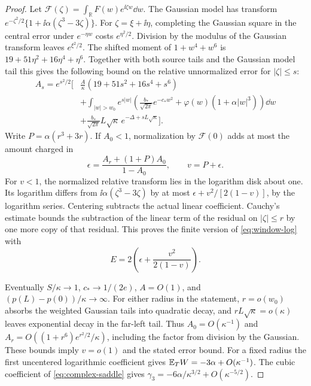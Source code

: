 \begin{proof}
Let \(\mathcal F(\zeta)=\int_{\mathbb R}F(w)e^{\ii\zeta w}\dd w\).
The Gaussian model has transform
\(e^{-\zeta^2/2}\{1+\ii\alpha(\zeta^3-3\zeta)\}\). For
\(\zeta=\xi+\ii\eta\), completing the Gaussian square in the central
error under \(e^{-\eta w}\) costs \(e^{\eta^2/2}\). Division by the
modulus of the Gaussian transform leaves \(e^{\xi^2/2}\). The shifted
moment of \(1+w^4+w^6\) is \(19+51\eta^2+16\eta^4+\eta^6\).
Together with both source tails and the Gaussian model tail this gives
the following bound on the relative unnormalized error for \(|\zeta|\le s\):
\begin{align}
 A_s=e^{s^2/2}\Bigg[&
  \frac{A}{\kappa}(19+51s^2+16s^4+s^6)\nonumber\\
 &+\int_{|w|>w_0}e^{s|w|}
    \left(\frac{b_*}{\sqrt{2\pi}}e^{-c_* w^2}
                     +\varphi(w)(1+\alpha|w|^3)\right)\dd w \nonumber\\
 &+\frac{b_*}{\sqrt{2\pi}}L\sqrt\kappa\,e^{-\Delta+sL\sqrt\kappa}\Bigg].
 \label{eq:window-source-test}
\end{align}
Write \(P=\alpha(r^3+3r)\). If \(A_0<1\), normalization by
\(\mathcal F(0)\) adds at most the amount charged in
\[
 \epsilon=\frac{A_r+(1+P)A_0}{1-A_0},\qquad v=P+\epsilon .
\]
For \(v<1\), the normalized relative transform lies in the logarithm
disk about one. Its logarithm differs from \(\ii\alpha(\zeta^3-3\zeta)\)
by at most \(\epsilon+v^2/[2(1-v)]\), by the logarithm series.
Centering subtracts the actual linear coefficient. Cauchy's estimate
bounds the subtraction of the linear term of the residual on
\(|\zeta|\le r\) by one more copy of that residual. This proves the finite
version of \eqref{eq:window-log} with
\begin{equation}
 E=2\left(\epsilon+\frac{v^2}{2(1-v)}\right).
 \label{eq:window-error-test}
\end{equation}

Eventually \(S/\kappa\to1\), \(c_*\to1/(2e)\), \(A=O(1)\), and
\((p(L)-p(0))/\kappa\to\infty\). For either radius in the statement,
\(r=o(w_0)\) absorbs the weighted Gaussian tails into quadratic
decay, and \(rL\sqrt\kappa=o(\kappa)\) leaves exponential decay in
the far-left tail. Thus \(A_0=O(\kappa^{-1})\) and
\(A_r=O((1+r^6)e^{r^2/2}/\kappa)\), including the factor from
division by the Gaussian. These bounds imply \(v=o(1)\) and the
stated error bound. For a fixed radius the first uncentered
logarithmic coefficient gives \(\mathbb E_T W=-3\alpha+O(\kappa^{-1})\).
The cubic coefficient of \eqref{eq:complex-saddle} gives
\(\gamma_3=-6\alpha/\kappa^{3/2}+O(\kappa^{-5/2})\).
\end{proof}


